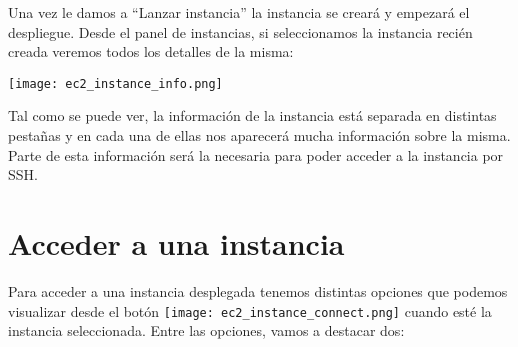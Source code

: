 Una vez le damos a “Lanzar instancia” la instancia se creará y empezará el despliegue. Desde el panel de instancias, si seleccionamos la instancia recién creada veremos todos los detalles de la misma:

\begin{center}
	\texttt{[image: ec2\_instance\_info.png]}
\end{center}

Tal como se puede ver, la información de la instancia está separada en distintas pestañas y en cada una de ellas nos aparecerá mucha información sobre la misma. Parte de esta información será la necesaria para poder acceder a la instancia por SSH.


\chapter{Acceder a una instancia}

Para acceder a una instancia desplegada tenemos distintas opciones que podemos visualizar desde el botón \texttt{[image: ec2\_instance\_connect.png]} cuando esté la instancia seleccionada. Entre las opciones, vamos a destacar dos:

